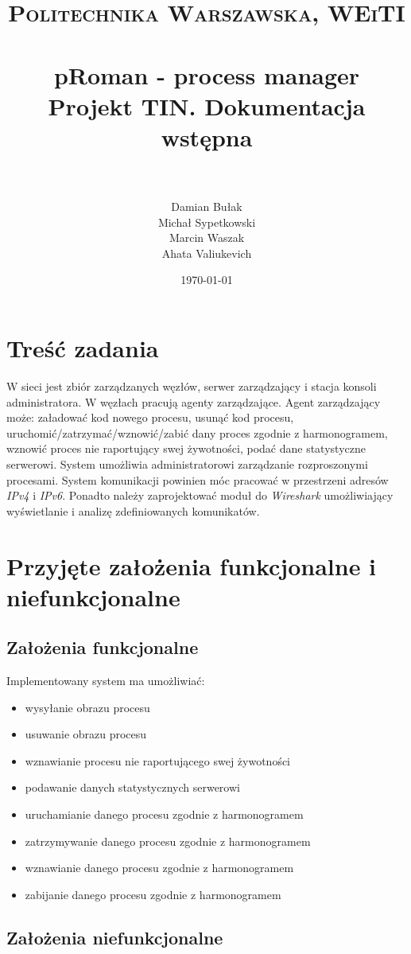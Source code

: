\documentclass[paper=a4, fontsize=11pt]{scrartcl} %
\title{	
\normalfont \normalsize 
\textsc{Politechnika Warszawska, WEiTI} \\ [25pt] %
\horrule{0.5pt} \\[0.4cm] %
\huge pRoman - process manager \\
\large Projekt TIN. Dokumentacja wstępna
 \\ %
\horrule{2pt} \\[0.5cm] %
}
\author{Damian Bułak\\ Michał Sypetkowski\\ Marcin Waszak\\ Ahata Valiukevich} %
\date{\normalsize\today} %
\begin{document}
\maketitle %


\section*{Treść zadania}

W sieci jest zbiór zarządzanych węzłów, serwer zarządzający i stacja konsoli administratora. W węzłach pracują agenty zarządzające. Agent zarządzający może: załadować kod nowego procesu, usunąć kod procesu, uruchomić/zatrzymać/wznowić/zabić dany proces zgodnie z harmonogramem, wznowić proces nie raportujący swej żywotności, podać dane statystyczne serwerowi. System umożliwia administratorowi zarządzanie rozproszonymi procesami. System komunikacji powinien móc pracować w przestrzeni adresów \textit{IPv4} i \textit{IPv6}. Ponadto należy zaprojektować moduł do \textit{Wireshark} umożliwiający wyświetlanie i analizę zdefiniowanych komunikatów. 


\section*{Przyjęte założenia funkcjonalne i niefunkcjonalne}

\subsection*{Założenia funkcjonalne}
Implementowany system ma umożliwiać: 
\begin{itemize}
\item wysyłanie obrazu procesu
\item usuwanie obrazu procesu
\item wznawianie  procesu nie raportującego swej żywotności 
\item podawanie danych statystycznych serwerowi
\item uruchamianie danego procesu zgodnie z harmonogramem
\item zatrzymywanie danego procesu zgodnie z harmonogramem
\item wznawianie danego procesu zgodnie z harmonogramem
\item zabijanie danego procesu zgodnie z harmonogramem
\end{itemize}

\subsection*{Założenia niefunkcjonalne}
\end{document}
